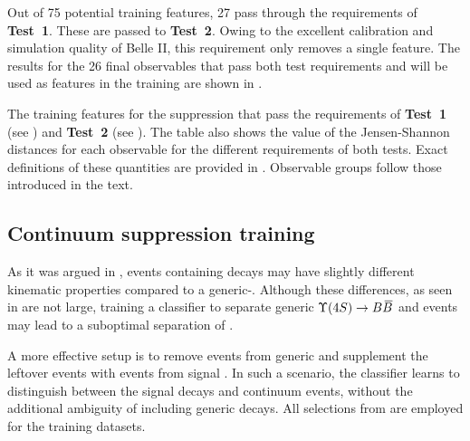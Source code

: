 Out of 75 potential training features, 27 pass through the requirements of \textbf{Test~1}.
These are passed to \textbf{Test~2}.
Owing to the excellent calibration and simulation quality of Belle II, this requirement only removes a single feature.
The results for the 26 final observables that pass both test requirements and will be used as features in the \BDT training
are shown in .

\begin{table}[htbp!]
    \centering
    \caption{\label{tab:passing_test1}The training features for the \epem\ra\qqbar suppression
    that pass the requirements of \textbf{Test~1} (see ) and \textbf{Test~2} (see ).
    The table also shows the value of the Jensen-Shannon distances for each observable for the different requirements of both tests.
    Exact definitions of these quantities are provided in .
    Observable groups follow those introduced in the text.
    }   
    
\end{table}

\subsection{Continuum suppression training}\label{sec:continuum_training}

As it was argued in , events containing \BtoXsgamma decays may have slightly different kinematic properties compared to a generic-\BB.
Although these differences, as seen in  are not large, training a classifier to separate generic $\FourS\ra\BB$ and \epem\ra\qqbar events may lead to a suboptimal separation of \BtoXsgamma.

A more effective setup is to remove \BB events from generic \MC and supplement the leftover events with \BtoXsgamma events from signal \MC. 
In such a scenario, the classifier learns to distinguish between the signal decays and continuum events, without the additional ambiguity of including generic \BB decays.
All selections from  are employed for the training datasets.

